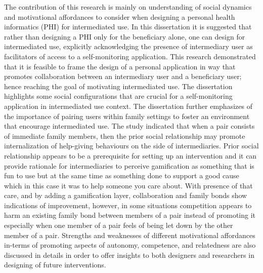 The contribution of this research is mainly on understanding of social dynamics and motivational affordances to consider when designing a personal health informatics (PHI) for intermediated use. In this dissertation it is suggested that rather than designing a PHI only for the beneficiary alone, one can design for intermediated use, explicitly acknowledging the presence of intermediary user as facilitators of access to a self-monitoring application. This research demonstrated that it is feasible to frame the design of a personal application in way that promotes collaboration between an intermediary user and a beneficiary user; hence reaching the goal of motivating intermediated use. The dissertation highlights some social configurations that are crucial for a self-monitoring application in intermediated use context. The dissertation further emphasizes of the importance of pairing users within family settings to foster an environment that encourage intermediated use.  The study indicated that when a pair consists of immediate family members, then the prior social relationship may promote internalization of help-giving behaviours on the side of intermediaries. Prior social relationship appears to be a prerequisite for setting up an intervention and it can provide rationale for intermediaries to perceive gamification as something that is fun to use but at the same time as something done to support a good cause which in this case it was to help someone you care about. With presence of that care, and by adding a gamification layer,  collaboration and family bonds show indications of improvement, however, in some situations competition appears to harm an existing family bond between members of a pair instead of promoting it especially when one member of a pair feels of being let down by the other member of a pair. Strengths and weaknesses of different motivational affordances in-terms of promoting aspects of autonomy, competence, and relatedness are also discussed in details in order to offer insights to both designers and researchers in designing of future interventions.
